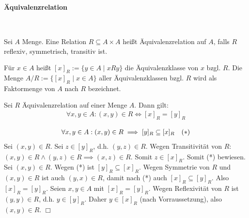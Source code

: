 \paragraph{Äquivalenzrelation} \
\begin{definition}
	Sei $A$ Menge. Eine Relation $R\subseteq A\times A$ heißt Äquivalenzrelation auf $A$, falls $R$ reflexiv, symmetrisch, transitiv ist.
\end{definition}
Für $x \in A$ heißt $[x]_R:=\{y\in A\mid xRy\}$ die Äquivalenzklasse von $x$ bzgl. $R$. Die Menge $A/R:=\{[x]_R\mid x\in A\}$ aller Äquivalenzklassen bzgl. $R$ wird als Faktormenge von $A$ nach $R$  bezeichnet.
\begin{theorem}
	Sei $R$ Äquivalenzrelation auf einer Menge $A$. Dann gilt:
	\begin{align*}
		\forall x,y \in A: (x,y) \in R \iff [x]_R=[y]_R
	\end{align*}
\end{theorem}
\prove
\begin{align*}
	\forall x,y \in A: (x,y) \in R \implies [y]_R \subseteq [x]_R \quad \text(*)
\end{align*}
Sei $(x,y)\in R$. Sei $z\in [y]_R$, d.h. $(y,z) \in R$. Wegen Transitivität von $R$: $(x,y)\in R \land (y,z)\in R \implies (x,z) \in R$. Somit $z\in [x]_R$. Somit (*) bewiesen.\\
Sei $(x,y)\in R$. Wegen (*) ist $[y]_R \subseteq [x]_R$. Wegen Symmetrie von $R$ und $(x,y)\in R$ ist auch $(y,x)\in R$, damit nach (*) auch $[x]_R\subseteq [y]_R$. Also $[x]_R=[y]_R$.
Seien $x,y \in A$ mit $[x]_R =[y]_R$. Wegen Reflexivität von $R$ ist $(y,y) \in R$, d.h. $y \in [y]_R$. Daher $y\in [x]_R$ (nach Vorraussetzung), also $(x,y) \in R$. $\Box$
